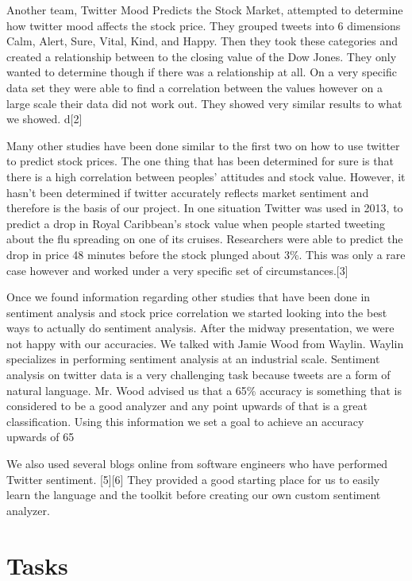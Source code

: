 \documentclass{acm_proc_article-sp}
\begin{document}
Another team, Twitter Mood Predicts the Stock Market, attempted to determine
how twitter mood affects the stock price. They grouped tweets into 6
dimensions Calm, Alert, Sure, Vital, Kind, and Happy. Then they took these
categories and created a relationship between to the closing value of the Dow
Jones. They only wanted to determine though if there was a relationship at all. 
On a very specific data set they were able to find a correlation between the values
however on a large scale their data did not work out. They showed very similar
results to what we showed. d[2] 

Many other studies have been done similar to the first two on how to use
twitter to predict stock prices. The one thing that has been determined for
sure is that there is a high correlation between peoples' attitudes and stock
value. However, it hasn't been determined if twitter accurately reflects market
sentiment and therefore is the basis of our project. In one situation Twitter
was used in 2013, to predict a drop in Royal Caribbean's stock value when
people started tweeting about the flu spreading on one of its cruises.
Researchers were able to predict the drop in price 48 minutes before the stock
plunged about 3\%. This was only a rare case however and worked under a very
specific set of circumstances.[3]

Once we found information regarding other studies that have been done in
sentiment analysis and stock price correlation we started looking into the best
ways to actually do sentiment analysis. After the midway presentation, we were not happy
with our accuracies. We talked with Jamie Wood from Waylin. Waylin specializes
in performing sentiment analysis at an industrial scale. Sentiment analysis on
twitter data is a very challenging task because tweets are a form of natural
language. Mr. Wood advised us that a 65\% accuracy is something that is
considered to be a good analyzer and any point upwards of that is a great
classification. Using this information we set a goal to achieve an accuracy
upwards of 65%

We also used several blogs online from software engineers who have performed
Twitter sentiment. [5][6] They provided a good starting place for us to easily learn
the language and the toolkit before creating our own custom sentiment analyzer. 

\section{Tasks}
\end{document}
